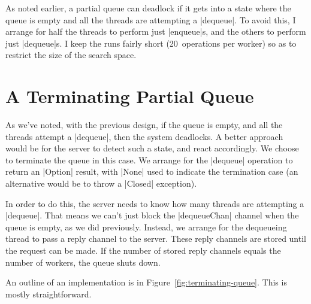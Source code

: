 As noted earlier, a partial queue can deadlock if it gets into a state where
the queue is empty and all the threads are attempting a |dequeue|.  To avoid
this, I arrange for half the threads to perform just |enqueue|s, and the
others to perform just |dequeue|s.  I keep the runs fairly short
(20~operations per worker) so as to restrict the size of the search space.



\section{A Terminating Partial Queue}

As we've noted, with the previous design, if the queue is empty, and all the
threads attempt a |dequeue|, then the system deadlocks.
%
A better approach would be for the server to detect such a state, and react
accordingly.  We choose to terminate the queue in this case.  We arrange for
the |dequeue| operation to return an |Option| result, with |None| used to
indicate the termination case (an alternative would be to throw a |Closed|
exception).

In order to do this, the server needs to know how many threads are attempting
a |dequeue|.  That means we can't just block the |dequeueChan| channel when
the queue is empty, as we did previously.  Instead, we arrange for the
dequeueing thread to pass a reply channel to the server.  These reply channels
are stored until the request can be made.  If the number of stored reply
channels equals the number of workers, the queue shuts down.

An outline of an implementation is in Figure~\ref{fig:terminating-queue}.
This is mostly straightforward.



